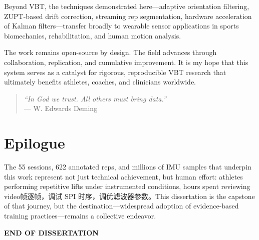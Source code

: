 Beyond VBT, the techniques demonstrated here---adaptive orientation filtering, ZUPT-based drift correction, streaming rep segmentation, hardware acceleration of Kalman filters---transfer broadly to wearable sensor applications in sports biomechanics, rehabilitation, and human motion analysis.

The work remains open-source by design. The field advances through collaboration, replication, and cumulative improvement. It is my hope that this system serves as a catalyst for rigorous, reproducible VBT research that ultimately benefits athletes, coaches, and clinicians worldwide.

\begin{quote}
\textit{``In God we trust. All others must bring data.''} \\
\textmd{--- W. Edwards Deming}
\end{quote}

\section*{Epilogue}

The 55 sessions, 622 annotated reps, and millions of IMU samples that underpin this work represent not just technical achievement, but human effort: athletes performing repetitive lifts under instrumented conditions, hours spent reviewing video帧逐帧，调试 SPI 时序，调优滤波器参数。This dissertation is the capstone of that journey, but the destination---widespread adoption of evidence-based training practices---remains a collective endeavor.

\vspace{1cm}
\begin{center}
\textbf{END OF DISSERTATION}
\end{center}

\newpage